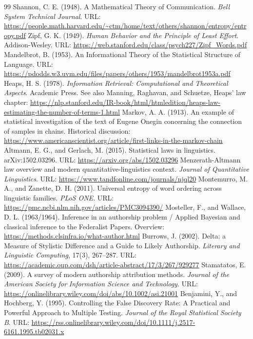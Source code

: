 \documentclass[11pt,a4paper]{article}
\begin{document}
\begin{thebibliography}{99}
 Shannon, C. E. (1948). A Mathematical Theory of Communication. \emph{Bell System Technical Journal}. URL: \url{https://people.math.harvard.edu/~ctm/home/text/others/shannon/entropy/entropy.pdf}
 Zipf, G. K. (1949). \emph{Human Behavior and the Principle of Least Effort}. Addison-Wesley. URL: \url{https://web.stanford.edu/class/psych227/Zipf_Words.pdf}
 Mandelbrot, B. (1953). An Informational Theory of the Statistical Structure of Language. URL: \url{https://pdodds.w3.uvm.edu/files/papers/others/1953/mandelbrot1953a.pdf}
 Heaps, H. S. (1978). \emph{Information Retrieval: Computational and Theoretical Aspects}. Academic Press. See also Manning, Raghavan, and Schuetze, Heaps' law chapter: \url{https://nlp.stanford.edu/IR-book/html/htmledition/heaps-law-estimating-the-number-of-terms-1.html}
 Markov, A. A. (1913). An example of statistical investigation of the text of Eugene Onegin concerning the connection of samples in chains. Historical discussion: \url{https://www.americanscientist.org/article/first-links-in-the-markov-chain}
 Altmann, E. G., and Gerlach, M. (2015). Statistical laws in linguistics. arXiv:1502.03296. URL: \url{https://arxiv.org/abs/1502.03296}
 Menzerath-Altmann law overview and modern quantitative-linguistics context. \emph{Journal of Quantitative Linguistics}. URL: \url{https://www.tandfonline.com/journals/njql20}
 Montemurro, M. A., and Zanette, D. H. (2011). Universal entropy of word ordering across linguistic families. \emph{PLoS ONE}. URL: \url{https://pmc.ncbi.nlm.nih.gov/articles/PMC3094390/}
 Mosteller, F., and Wallace, D. L. (1963/1964). Inference in an authorship problem / Applied Bayesian and classical inference to the Federalist Papers. Overview: \url{https://methods.clsinfra.io/what-author.html}
 Burrows, J. (2002). Delta: a Measure of Stylistic Difference and a Guide to Likely Authorship. \emph{Literary and Linguistic Computing}, 17(3), 267--287. URL: \url{https://academic.oup.com/dsh/article-abstract/17/3/267/929277}
 Stamatatos, E. (2009). A survey of modern authorship attribution methods. \emph{Journal of the American Society for Information Science and Technology}. URL: \url{https://onlinelibrary.wiley.com/doi/abs/10.1002/asi.21001}
 Benjamini, Y., and Hochberg, Y. (1995). Controlling the False Discovery Rate: A Practical and Powerful Approach to Multiple Testing. \emph{Journal of the Royal Statistical Society B}. URL: \url{https://rss.onlinelibrary.wiley.com/doi/10.1111/j.2517-6161.1995.tb02031.x}

\end{thebibliography}
\end{document}
